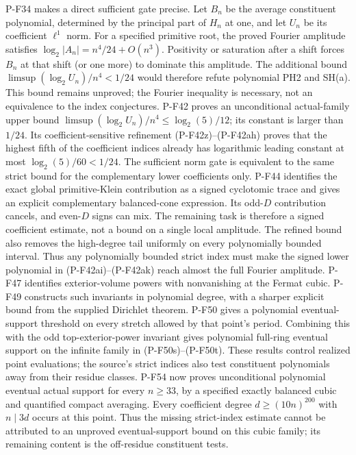 \documentclass[11pt,a4paper]{article}
\begin{document}
\begin{description}
P-F34 makes a direct sufficient gate precise. Let $B_n$ be the
average constituent polynomial, determined by the principal part
of $H_n$ at one, and let $U_n$ be its coefficient $\ell^1$ norm.
For a specified primitive root, the proved Fourier amplitude satisfies
$\log_2|A_n|=n^4/24+O(n^3)$. Positivity or saturation
after a shift forces $B_n$ at that shift (or one more) to dominate
this amplitude. The additional bound
$\limsup (\log_2 U_n)/n^4<1/24$ would therefore refute polynomial
PH2 and SH(a). This bound remains unproved; the Fourier inequality
is necessary, not an equivalence to the index conjectures.
P-F42 proves an unconditional actual-family upper bound
$\limsup(\log_2 U_n)/n^4\le\log_2(5)/12$; its constant
is larger than $1/24$. Its coefficient-sensitive refinement
(P-F42z)--(P-F42ah) proves that the highest fifth of the
coefficient indices already has logarithmic leading constant
at most $\log_2(5)/60<1/24$. The sufficient norm gate is
equivalent to the same strict bound for the complementary
lower coefficients only. P-F44 identifies the exact global
primitive-Klein contribution as a signed cyclotomic trace and
gives an explicit complementary balanced-cone expression.
Its odd-$D$ contribution cancels, and even-$D$ signs can mix.
The remaining task is therefore a signed coefficient estimate,
not a bound on a single local amplitude.
The refined bound also removes the high-degree tail uniformly
on every polynomially bounded interval. Thus any polynomially
bounded strict index must make the signed lower polynomial in
(P-F42ai)--(P-F42ak) reach almost the full Fourier amplitude.
P-F47 identifies exterior-volume powers with nonvanishing at the
Fermat cubic. P-F49 constructs such invariants in polynomial
degree, with a sharper explicit bound from the supplied Dirichlet
theorem. P-F50 gives a polynomial eventual-support threshold on
every stretch allowed by that point's period. Combining this
with the odd top-exterior-power invariant gives polynomial
full-ring eventual support on the infinite family in
(P-F50s)--(P-F50t). These results
control realized point evaluations; the source's strict indices
also test constituent polynomials away from their residue classes.
P-F54 now proves unconditional polynomial eventual actual support
for every $n\ge33$, by a specified exactly balanced cubic and
quantified compact averaging. Every coefficient degree
$d\ge(10n)^{200}$ with $n\mid3d$ occurs at this point. Thus
the missing strict-index estimate cannot be attributed to an
unproved eventual-support bound on this cubic family; its
remaining content is the off-residue constituent tests.

\end{description}
\end{document}
